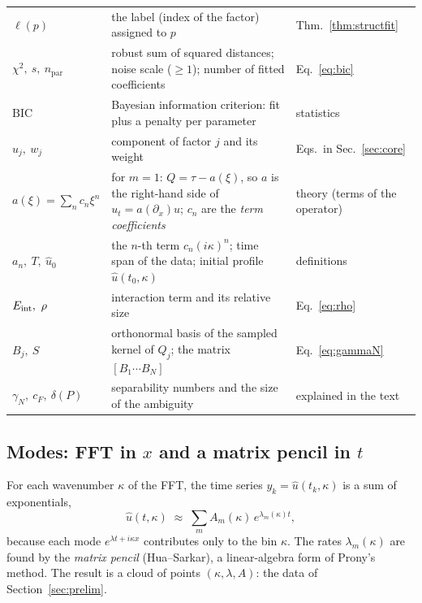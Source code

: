 \begin{symbols}
\begin{tabular}{@{}L{2.5cm}L{6.0cm}L{4.4cm}@{}}
$\ell(p)$ & the label (index of the factor) assigned to $p$ & Thm.~\ref{thm:structfit}\\
$\chi^2,\ s,\ n_{\mathrm{par}}$ & robust sum of squared distances; noise scale ($\ge1$); number of fitted coefficients & Eq.~\eqref{eq:bic}\\
$\mathrm{BIC}$ & Bayesian information criterion: fit plus a penalty per parameter & statistics\\
$u_j,\ w_j$ & component of factor $j$ and its weight & Eqs.~in Sec.~\ref{sec:core}\\
$a(\xi)=\sum_nc_n\xi^n$ & for $m=1$: $Q=\tau-a(\xi)$, so $a$ is the right-hand side of $u_t=a(\partial_x)u$; $c_n$ are the \emph{term coefficients} & theory (terms of the operator)\\
$a_n,\ T,\ \hat u_0$ & the $n$-th term $c_n(i\kappa)^n$; time span of the data; initial profile $\hat u(t_0,\kappa)$ & definitions\\
$E_{\mathrm{int}},\ \rho$ & interaction term and its relative size & Eq.~\eqref{eq:rho}\\
$B_j,\ S$ & orthonormal basis of the sampled kernel of $Q_j$; the matrix $[B_1\cdots B_N]$ & Eq.~\eqref{eq:gammaN}\\
$\gamma_N,\ c_F,\ \delta(P)$ & separability numbers and the size of the ambiguity & explained in the text\\
\end{tabular}
\end{symbols}

\subsection{Modes: FFT in $x$ and a matrix pencil in $t$}\label{sec:modes}
For each wavenumber $\kappa$ of the FFT, the time series $y_k=\hat u(t_k,\kappa)$ is a sum of exponentials,
\begin{equation}\label{eq:expsum}
\hat u(t,\kappa)\;\approx\;\sum_{m}A_m(\kappa)\,e^{\lambda_m(\kappa)t},
\end{equation}
because each mode $e^{\lambda t+i\kappa x}$ contributes only to the bin $\kappa$. The rates $\lambda_m(\kappa)$ are found by the \emph{matrix pencil} (Hua--Sarkar), a linear-algebra form of Prony's method. The result is a cloud of points $(\kappa,\lambda,A)$: the data of Section~\ref{sec:prelim}.

